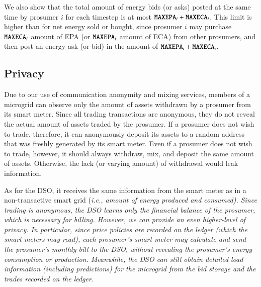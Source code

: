 We also show that the total amount of energy bids (or asks) posted at
the same time by prosumer $i$ for each timestep is at most
$\texttt{MAXEPA}_i + \texttt{MAXECA}_i$.  This limit is higher than for
net energy sold or bought, since prosumer $i$ may purchase
$\texttt{MAXECA}_i$ amount of EPA (or $\texttt{MAXEPA}_i$ amount of ECA)
from other prosumers, and then post an energy ask (or bid) in the
amount of $\texttt{MAXEPA}_i + \texttt{MAXECA}_i$.

\subsection{Privacy}
Due to our use of communication anonymity and mixing services, members
of a microgrid can observe only the amount of assets withdrawn by a
prosumer from its smart meter.
Since all trading transactions are anonymous, they do not reveal the
actual amount of assets traded by the prosumer.  If a prosumer does
not wish to trade, therefore, it can anonymously deposit its assets to
a random address that was freshly generated by its smart meter.  Even
if a prosumer does not wish to trade, however, it should always
withdraw, mix, and deposit the same amount of assets.  Otherwise, the
lack (or varying amount) of withdrawal would leak information.

As for the DSO, it receives the same information from the smart meter
as in a non-transactive smart grid (\em{i.e.}, amount of energy
produced and consumed).  Since trading is anonymous, the DSO learns
only the financial balance of the prosumer, which is necessary for
billing.  However, we can provide an even higher-level of privacy.  In
particular, since price policies are recorded on the ledger (which the
smart meters may read), each prosumer's smart meter may calculate and
send the prosumer's monthly bill to the DSO, without revealing the
prosumer's energy consumption or production.  Meanwhile, the DSO can
still obtain detailed load information (including predictions) for the
microgrid from the bid storage and the trades recorded on the ledger.


